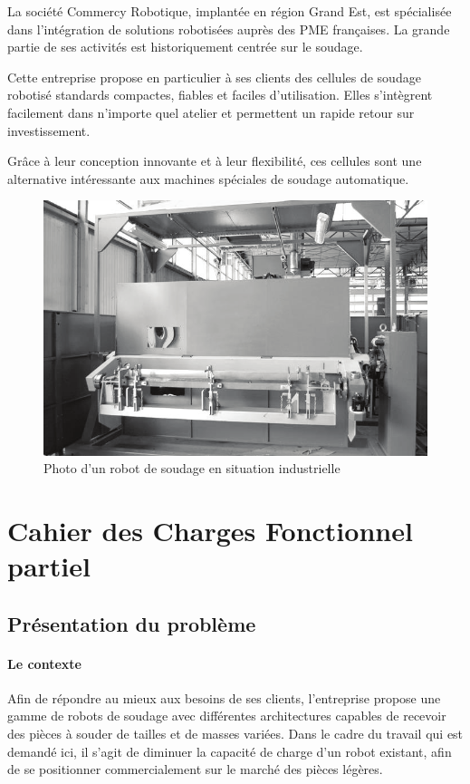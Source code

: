 

La société Commercy Robotique, implantée en région Grand Est, est spécialisée dans l’intégration de solutions robotisées auprès des PME françaises. La grande partie de ses activités est historiquement centrée sur le soudage.

Cette entreprise propose en particulier à ses clients des cellules de soudage robotisé standards compactes, fiables et faciles d’utilisation. 
Elles s’intègrent facilement dans n’importe quel atelier et permettent un rapide retour sur investissement.

Grâce à leur conception innovante et à leur flexibilité, ces cellules sont une alternative intéressante aux machines spéciales de soudage automatique.

\begin{figure}[!h]
\centering\includegraphics[width=0.8\linewidth]{img/fig01}
 \caption{Photo d'un robot de soudage en situation industrielle}
 \label{img01}
\end{figure}

\section*{Cahier des Charges Fonctionnel partiel}

\subsection*{Présentation du problème}

\paragraph{Le contexte}

Afin de répondre au mieux aux besoins de ses clients, l’entreprise propose une gamme de robots de soudage avec différentes architectures capables de recevoir des pièces à souder de tailles et de masses variées. Dans le cadre du travail qui est demandé ici, il s’agit de
diminuer la capacité de charge d’un robot existant, afin de se positionner commercialement sur le marché des pièces légères.

